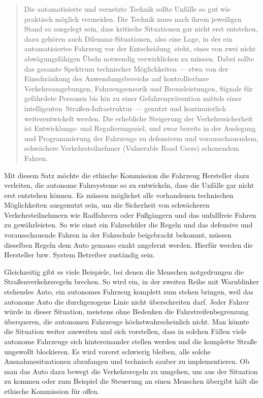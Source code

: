 \documentclass[twoside,a4paper,12pt]{article}
\begin{document}
\begin{quote}
\glqq
Die automatisierte und vernetzte Technik sollte Unfälle so gut wie praktisch möglich vermeiden. Die Technik muss nach 
ihrem jeweiligen Stand so ausgelegt sein, dass kritische
Situationen gar nicht erst entstehen, dazu gehören auch Dilemma-Situationen, also eine
Lage, in der ein automatisiertes Fahrzeug vor der \glqq Entscheidung\grqq\ steht, eines von zwei
nicht abwägungsfähigen Übeln notwendig verwirklichen zu müssen. Dabei sollte das gesamte Spektrum technischer 
Möglichkeiten --- etwa von der Einschränkung des Anwendungsbereichs auf kontrollierbare Verkehrsumgebungen, 
Fahrzeugsensorik und Bremsleistungen, Signale für gefährdete Personen bis hin zu einer Gefahrenprävention mittels
einer \glqq intelligenten\grqq\ Straßen-Infrastruktur --- genutzt und kontinuierlich weiterentwickelt
werden. Die erhebliche Steigerung der Verkehrssicherheit ist Entwicklungs- und Regulierungsziel, und zwar bereits in der 
Auslegung und Programmierung der Fahrzeuge zu defensivem und vorausschauendem, schwächere Verkehrsteilnehmer (\glqq Vulnerable Road
Users\grqq) schonendem Fahren.\grqq\mbox{~\cite[S. 10]{ek}}
\end{quote}
Mit diesem Satz möchte die ethische Kommission die Fahrzeug Hersteller dazu verleiten, die autonome Fahrsysteme so zu entwickeln, dass die Unfälle gar nicht erst entstehen können.  Es müssen möglichst alle vorhandenen technischen Möglichkeiten ausgenutzt sein, um die Sicherheit von schwächeren Verkehrsteilnehmern wie Radfahrern oder Fußgängern und das unfallfreie Fahren zu gewährleisten. So wie einst ein Fahrschüler die Regeln und das defensive und vorausschauende Fahren in der Fahrschule beigebracht bekommt, müssen dieselben Regeln dem Auto genauso exakt angelernt werden. Hierfür werden die Hersteller bzw. System Betreiber zuständig sein.

Gleichzeitig gibt es viele Beispiele, bei denen die Menschen notgedrungen die Straßenverkehrsregeln brechen. So wird ein, in der zweiten Reihe mit Warnblinker stehendes Auto, ein autonomes Fahrzeug komplett zum stehen bringen, weil das autonome Auto die durchgezogene Linie nicht überschreiten darf. \cite{zeit1} Jeder Fahrer würde in dieser Situation, meistens ohne Bedenken die Fahrstreifenbegrenzung überqueren, die autonomen Fahrzeuge höchstwahrscheinlich nicht. Man könnte die Situation weiter ausweiten und sich vorstellen, dass in solchen Fällen viele autonome Fahrzeuge sich hintereinander stellen werden und die komplette Straße ungewollt blockieren. Es wird vorerst schwierig bleiben, alle solche Ausnahmesituationen abzufangen und technisch sauber zu implementieren.  Ob man das Auto dazu bewegt die Verkehrsregeln zu umgehen, um aus der Situation zu kommen oder zum Beispiel die Steuerung an einen Menschen übergibt hält die ethische Kommission für offen. 
\end{document}
